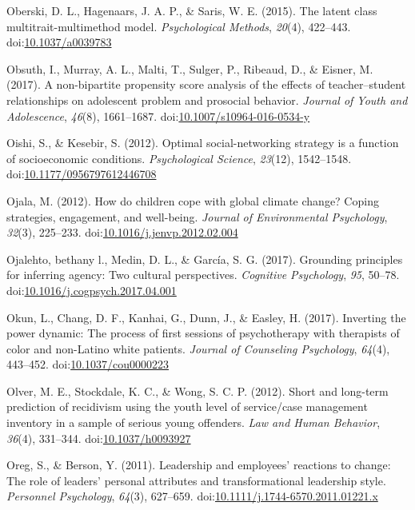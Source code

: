 \documentclass[english,man]{apa6}
\theoremstyle{definition}
\theoremstyle{definition}
\theoremstyle{definition}
\theoremstyle{remark}
\begin{document}
\hypertarget{ref-Oberski2015}{}
Oberski, D. L., Hagenaars, J. A. P., \& Saris, W. E. (2015). The latent
class multitrait-multimethod model. \emph{Psychological Methods},
\emph{20}(4), 422--443.
doi:\href{https://doi.org/10.1037/a0039783}{10.1037/a0039783}

\hypertarget{ref-Obsuth2017}{}
Obsuth, I., Murray, A. L., Malti, T., Sulger, P., Ribeaud, D., \&
Eisner, M. (2017). A non-bipartite propensity score analysis of the
effects of teacher--student relationships on adolescent problem and
prosocial behavior. \emph{Journal of Youth and Adolescence},
\emph{46}(8), 1661--1687.
doi:\href{https://doi.org/10.1007/s10964-016-0534-y}{10.1007/s10964-016-0534-y}

\hypertarget{ref-Oishi2012}{}
Oishi, S., \& Kesebir, S. (2012). Optimal social-networking strategy is
a function of socioeconomic conditions. \emph{Psychological Science},
\emph{23}(12), 1542--1548.
doi:\href{https://doi.org/10.1177/0956797612446708}{10.1177/0956797612446708}

\hypertarget{ref-Ojala2012}{}
Ojala, M. (2012). How do children cope with global climate change?
Coping strategies, engagement, and well-being. \emph{Journal of
Environmental Psychology}, \emph{32}(3), 225--233.
doi:\href{https://doi.org/10.1016/j.jenvp.2012.02.004}{10.1016/j.jenvp.2012.02.004}

\hypertarget{ref-Ojalehto2017}{}
Ojalehto, bethany l., Medin, D. L., \& García, S. G. (2017). Grounding
principles for inferring agency: Two cultural perspectives.
\emph{Cognitive Psychology}, \emph{95}, 50--78.
doi:\href{https://doi.org/10.1016/j.cogpsych.2017.04.001}{10.1016/j.cogpsych.2017.04.001}

\hypertarget{ref-Okun2017}{}
Okun, L., Chang, D. F., Kanhai, G., Dunn, J., \& Easley, H. (2017).
Inverting the power dynamic: The process of first sessions of
psychotherapy with therapists of color and non-Latino white patients.
\emph{Journal of Counseling Psychology}, \emph{64}(4), 443--452.
doi:\href{https://doi.org/10.1037/cou0000223}{10.1037/cou0000223}

\hypertarget{ref-Olver2012}{}
Olver, M. E., Stockdale, K. C., \& Wong, S. C. P. (2012). Short and
long-term prediction of recidivism using the youth level of service/case
management inventory in a sample of serious young offenders. \emph{Law
and Human Behavior}, \emph{36}(4), 331--344.
doi:\href{https://doi.org/10.1037/h0093927}{10.1037/h0093927}

\hypertarget{ref-Oreg2011}{}
Oreg, S., \& Berson, Y. (2011). Leadership and employees' reactions to
change: The role of leaders' personal attributes and transformational
leadership style. \emph{Personnel Psychology}, \emph{64}(3), 627--659.
doi:\href{https://doi.org/10.1111/j.1744-6570.2011.01221.x}{10.1111/j.1744-6570.2011.01221.x}
\end{document}
